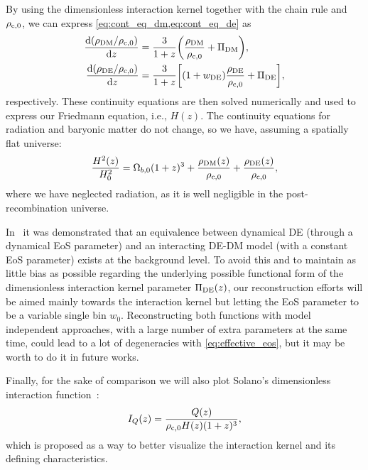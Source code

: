 \documentclass[twocolumn,a4paper,reprint,amssymb,aps,prd,groupedaddress,superscriptaddress,nofootinbib]{revtex4-2}
\begin{document}
By using the dimensionless interaction kernel together with the chain rule and $\rho_{\rm c,0}$, we can express
\cref{eq:cont_eq_dm,eq:cont_eq_de} as
%
\begin{subequations}\label{subeqs:cont}
     \begin{align}
       \frac{{\rm d}(\rho_{\rm DM}/\rho_{\rm c,0})}{{\rm d}z} &= \frac{3}{1+z}\bigg (
       \frac{\rho_{\rm DM}}{\rho_{\rm c,0}} + \Pi_{\rm DM} \bigg ), \label{subeq:cont_dens_param_dm}\\
     \frac{{\rm d}(\rho_{\rm DE}/\rho_{\rm c,0})}{{\rm d}z} &= \frac{3}{1+z}\bigg[(1
     +w_{\rm DE})\frac{\rho_{\rm DE}}{\rho_{\rm c,0}} + \Pi_{\rm DE} \bigg], \label{subeq:cont_dens_param_de}
     \end{align}
\end{subequations}
%
respectively. These continuity equations are then solved numerically and used to express our Friedmann equation,
i.e., $H(z)$. The continuity equations for radiation and baryonic matter do not change, so we have,
assuming a spatially flat universe:
%
\begin{equation}
    \frac{H^2(z)}{H_0^2} =  \Omega_{b,0}(1+z)^3 +  \frac{\rho_{\rm DM}(z)}{\rho_{\rm c,0}}+\frac{\rho_{\rm DE}(z)}{\rho_{\rm c,0}},
\end{equation}
%
where we have neglected radiation, as it is well negligible in the post-recombination universe.

In~\cite{vonMarttens:2019ixw} it was demonstrated that an equivalence between dynamical DE (through a
dynamical EoS parameter) and an interacting DE-DM model (with a constant EoS parameter) exists at the
background level. To avoid this and to maintain as little bias as possible regarding the underlying
possible functional form of the dimensionless interaction kernel parameter $\Pi_{\rm DE}(z)$, our
reconstruction efforts will be aimed mainly towards the interaction kernel but letting the EoS parameter
to be a variable single bin $w_0$. Reconstructing both functions with model independent approaches,
with a large number of extra parameters at the same time, could lead to a lot of degeneracies with
\cref{eq:effective_eos}, but it may be worth to do it in future works.


Finally, for the sake of comparison we will also plot Solano's dimensionless interaction function~\cite{Solano:2012zw}:
%
\begin{equation}
    I_Q(z) = \frac{Q(z)}{\rho_{\rm c,0} H(z) (1+z)^3},
\end{equation}
%
which is proposed as a way to better visualize the interaction kernel and its defining characteristics.
\end{document}
